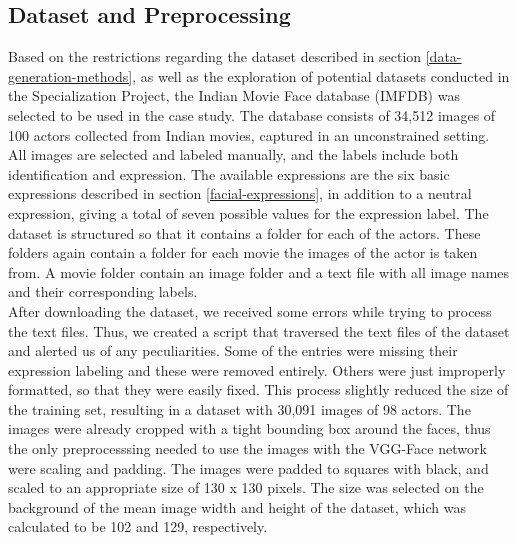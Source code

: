 
\subsection{Dataset and Preprocessing} %

Based on the restrictions regarding the dataset described in section \ref{data-generation-methods}, as well as the exploration of potential datasets conducted in the Specialization Project, the Indian Movie Face database (IMFDB) \cite{imfdb} was selected to be used in the case study. The database consists of 34,512 images of 100 actors collected from Indian movies, captured in an unconstrained setting. All images are selected and labeled manually, and the labels include both identification and expression. The available expressions are the six basic expressions described in section \ref{facial-expressions}, in addition to a neutral expression, giving a total of seven possible values for the expression label. The dataset is structured so that it contains a folder for each of the actors. These folders again contain a folder for each movie the images of the actor is taken from. A movie folder contain an image folder and a text file with all image names and their corresponding labels. \\

\noindent After downloading the dataset, we received some errors while trying to process the text files. Thus, we created a script that traversed the text files of the dataset and alerted us of any peculiarities. Some of the entries were missing their expression labeling and these were removed entirely. Others were just improperly formatted, so that they were easily fixed. This process slightly reduced the size of the training set, resulting in a dataset with 30,091 images of 98 actors. The images were already cropped with a tight bounding box around the faces, thus the only preprocesssing needed to use the images with the VGG-Face network were scaling and padding. The images were padded to squares with black, and scaled to an appropriate size of 130 x 130 pixels. The size was selected on the background of the mean image width and height of the dataset, which was calculated to be 102 and 129, respectively. \\

